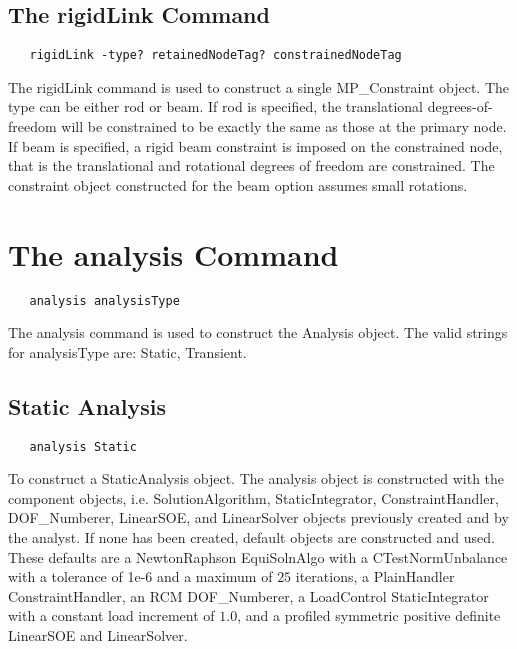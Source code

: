 \documentclass[12pt]{article}
\begin{document}
\subsection{The rigidLink Command}
{\sf\small
\begin{verbatim}
   rigidLink -type? retainedNodeTag? constrainedNodeTag
\end{verbatim}
}

The rigidLink command is used to construct a single MP\_Constraint object.
The type can be either rod or beam. If rod is specified, the
translational degrees-of-freedom will be constrained to be exactly the
same as those at the primary node. If beam is specified, a rigid beam
constraint is imposed on the constrained node, that is the translational and
rotational degrees of freedom are constrained. The constraint object
constructed for the beam option assumes small rotations.

\section {The analysis Command}

{\sf\small
\begin{verbatim}
   analysis analysisType 
\end{verbatim}
}

The analysis command is used to construct the Analysis object.
The valid strings for analysisType are: Static, Transient. 

\subsection{Static Analysis}

{\sf\small
\begin{verbatim}
   analysis Static 
\end{verbatim}
}

To construct a StaticAnalysis object. The analysis object is
constructed with the component objects, i.e. SolutionAlgorithm, StaticIntegrator,
ConstraintHandler, DOF\_Numberer, LinearSOE, and LinearSolver objects
previously created and by the analyst. If none has been created,
default objects are constructed and used. These defaults are a
NewtonRaphson EquiSolnAlgo with a CTestNormUnbalance with a tolerance
of 1e-6 and a maximum of $25$ iterations, a PlainHandler
ConstraintHandler, an RCM DOF\_Numberer, a LoadControl
StaticIntegrator with a constant load increment of $1.0$, and a
profiled symmetric positive definite LinearSOE and LinearSolver.
\end{document}
